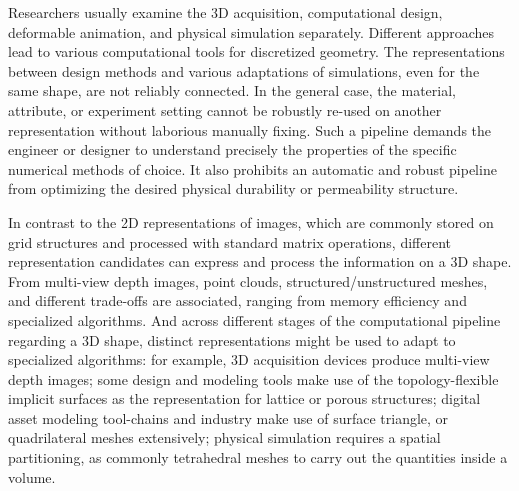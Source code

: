 Researchers usually examine the 3D acquisition, computational design, deformable animation, and physical simulation separately. Different approaches lead to various computational tools for discretized geometry.
The representations between design methods and various adaptations of simulations, even for the same shape, are not reliably connected.
In the general case, the material, attribute, or experiment setting cannot be robustly re-used on another representation without laborious manually fixing. Such a pipeline demands the engineer or designer to understand precisely the properties of the specific numerical methods of choice. It also prohibits an automatic and robust pipeline from optimizing the desired physical durability or permeability structure.

In contrast to the 2D representations of images, which are commonly stored on grid structures and processed with standard matrix operations, different representation candidates can express and process the information on a 3D shape. 
From multi-view depth images, point clouds, structured/unstructured meshes, and different trade-offs are associated, ranging from memory efficiency and specialized algorithms. And across different stages of the computational pipeline regarding a 3D shape, distinct representations might be used to adapt to specialized algorithms: for example, 3D acquisition devices produce multi-view depth images; some design and modeling tools make use of the topology-flexible implicit surfaces as the representation for lattice or porous structures; digital asset modeling tool-chains and industry make use of surface triangle, or quadrilateral meshes extensively; physical simulation requires a spatial partitioning, as commonly tetrahedral meshes to carry out the quantities inside a volume. 

